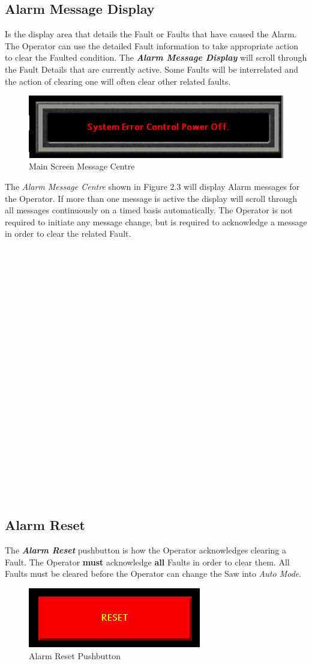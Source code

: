 \subsection{Alarm Message Display} Is the display area that details the Fault or Faults that have caused the Alarm. The Operator can use the detailed Fault information to take appropriate action to clear the Faulted condition. The \textbf{\textit{Alarm Message Display}} will scroll through the Fault Details that are currently active. Some Faults will be interrelated and the action of clearing one will often clear other related faults.
\begin{figure}
	\centering
	\includegraphics[width=.5\linewidth]{screen-captures/alarm-msg-cntr}
	\caption{Main Screen Message Centre}
	\label{fig:alarm-msg-cntr}
\end{figure}
The \textit{Alarm Message Centre} shown in Figure 2.3 will display Alarm messages for the Operator. If more than one message is active the display will scroll through all messages continuously on a timed basis automatically. The Operator is not required to initiate any message change, but is required to acknowledge a message in order to clear the related Fault.
\\
\\
\\
\\
\\
\\
\\
\\
\\
\\
\\
\\
\\
\\
\\
\\
\\
\\
\\
\\
\\
\\
\\
\pagebreak
\subsection{Alarm Reset} The \textbf{\textit{Alarm Reset}} pushbutton is how the Operator acknowledges clearing a Fault. The Operator \textbf{must} acknowledge \textbf{all} Faults in order to clear them. All Faults must be cleared before the Operator can change the Saw into \textit{Auto Mode}. 
\begin{figure}
	\centering
	\includegraphics[width=.3\linewidth]{screen-captures/alarms-reset}
	\caption{Alarm Reset Pushbutton}
	\label{fig:alarm-reset}
\end{figure}
